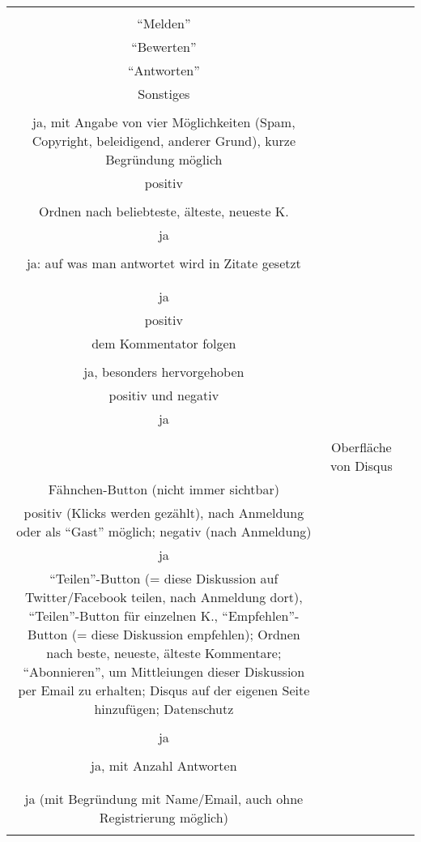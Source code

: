 \begin{landscape}
\begin{tabular}{ccc}
{		
Funktionen im Kommentar	\\
``Melden''\\
``Bewerten''\\
``Antworten''\\
Sonstiges\\
&		%
		\\
		ja, mit Angabe von vier Möglichkeiten (Spam, Copyright, beleidigend, anderer Grund), kurze Begründung möglich\\
		positiv\\
		\\
		Ordnen nach beliebteste, älteste, neueste K.
		&
		\\
		ja\\
		\\
		ja: auf was man antwortet wird in Zitate gesetzt\\
		\\
		&
		\\
		ja\\
		positiv\\
		dem Kommentator folgen\\
		&
		\\
		ja, besonders hervorgehoben\\
		positiv und negativ\\
		ja\\
		\\
		&
		Oberfläche von Disqus\\
		Fähnchen-Button (nicht immer sichtbar)\\
		positiv (Klicks werden gezählt), nach Anmeldung oder als ``Gast'' möglich; negativ (nach Anmeldung)\\
		ja\\
		``Teilen''-Button (= diese Diskussion auf Twitter/Facebook teilen, nach Anmeldung dort), ``Teilen''-Button für einzelnen K., 		``Empfehlen''-Button (= diese Diskussion empfehlen); Ordnen nach beste, neueste, älteste Kommentare; ``Abonnieren'', um Mittleiungen dieser Diskussion per Email zu erhalten; Disqus auf der eigenen Seite hinzufügen; Datenschutz\\
		&
		\\
		ja\\
		\\
		ja, mit Anzahl Antworten\\
		\\
		&
		\\
		ja (mit Begründung mit Name/Email, auch ohne Registrierung möglich)\\
}
\end{tabular}
\end{landscape}
